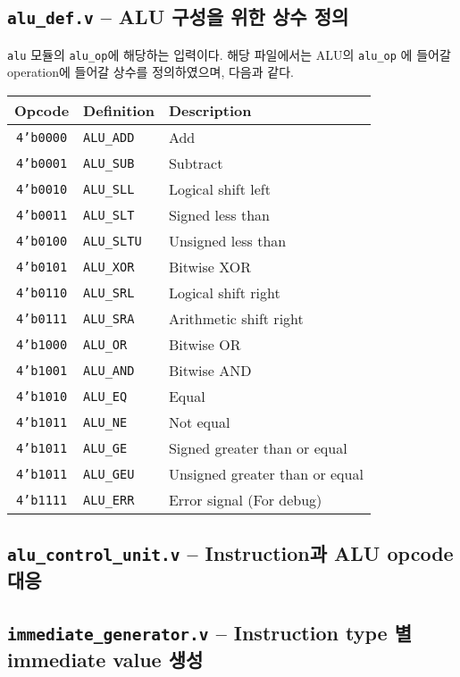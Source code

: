 \documentclass{scrartcl}
\begin{document}
\subsection{\texttt{alu\_def.v} -- ALU 구성을 위한 상수 정의}
\texttt{alu} 모듈의 \texttt{alu\_op}에 해당하는 입력이다. 해당 파일에서는 ALU의 \texttt{alu\_op} 에 들어갈
operation에 들어갈 상수를 정의하였으며, 다음과 같다.
\begin{center}
    \begin{tabular}{c l l}
        Opcode & Definition & Description \\ \hline
        \texttt{4'b0000} & \texttt{ALU\_ADD} & Add \\
        \texttt{4'b0001} & \texttt{ALU\_SUB} & Subtract \\
        \texttt{4'b0010} & \texttt{ALU\_SLL} & Logical shift left \\
        \texttt{4'b0011} & \texttt{ALU\_SLT} & Signed less than \\
        \texttt{4'b0100} & \texttt{ALU\_SLTU} & Unsigned less than \\
        \texttt{4'b0101} & \texttt{ALU\_XOR} & Bitwise XOR \\
        \texttt{4'b0110} & \texttt{ALU\_SRL} & Logical shift right \\
        \texttt{4'b0111} & \texttt{ALU\_SRA} & Arithmetic shift right \\
        \texttt{4'b1000} & \texttt{ALU\_OR} & Bitwise OR \\
        \texttt{4'b1001} & \texttt{ALU\_AND} & Bitwise AND \\
        \texttt{4'b1010} & \texttt{ALU\_EQ} & Equal \\
        \texttt{4'b1011} & \texttt{ALU\_NE} & Not equal \\
        \texttt{4'b1011} & \texttt{ALU\_GE} & Signed greater than or equal \\
        \texttt{4'b1011} & \texttt{ALU\_GEU} & Unsigned greater than or equal \\
        \texttt{4'b1111} & \texttt{ALU\_ERR} & Error signal (For debug)
    \end{tabular}
\end{center}

\subsection{\texttt{alu\_control\_unit.v} -- Instruction과 ALU opcode 대응}

\subsection{\texttt{immediate\_generator.v} -- Instruction type 별 immediate value 생성}
\end{document}
